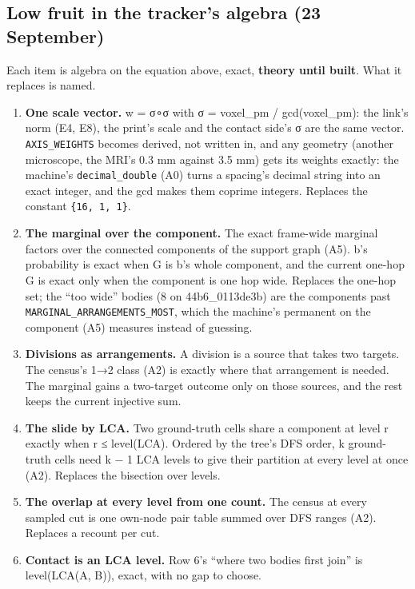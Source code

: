 \subsection{\texorpdfstring{Low fruit in the tracker's algebra (23 September)}{Low fruit in the tracker's algebra (23 September)}}

Each item is algebra on the equation above, exact, \textbf{theory until built}. What it replaces is named.

\begin{enumerate}
\item \textbf{One scale vector.} w = σ∘σ with σ = voxel\_\allowbreak{}pm / gcd(voxel\_\allowbreak{}pm): the link's norm (E4, E8), the print's scale and the contact side's σ are the same vector. \texttt{AXIS\_\allowbreak{}WEIGHTS} becomes derived, not written in, and any geometry (another microscope, the MRI's 0.3 mm against 3.5 mm) gets its weights exactly: the machine's \texttt{decimal\_\allowbreak{}double} (A0) turns a spacing's decimal string into an exact integer, and the gcd makes them coprime integers. Replaces the constant \texttt{\{16, 1, 1\}}.
\item \textbf{The marginal over the component.} The exact frame-wide marginal factors over the connected components of the support graph (A5). b's probability is exact when G is b's whole component, and the current one-hop G is exact only when the component is one hop wide. Replaces the one-hop set; the “too wide” bodies (8 on 44b6\_\allowbreak{}0113de3b) are the components past \texttt{MARGINAL\_\allowbreak{}ARRANGEMENTS\_\allowbreak{}MOST}, which the machine's permanent on the component (A5) measures instead of guessing.
\item \textbf{Divisions as arrangements.} A division is a source that takes two targets. The census's 1→2 class (A2) is exactly where that arrangement is needed. The marginal gains a two-target outcome only on those sources, and the rest keeps the current injective sum.
\item \textbf{The slide by LCA.} Two ground-truth cells share a component at level r exactly when r ≤ level(LCA). Ordered by the tree's DFS order, k ground-truth cells need k − 1 LCA levels to give their partition at every level at once (A2). Replaces the bisection over levels.
\item \textbf{The overlap at every level from one count.} The census at every sampled cut is one own-node pair table summed over DFS ranges (A2). Replaces a recount per cut.
\item \textbf{Contact is an LCA level.} Row 6's “where two bodies first join” is level(LCA(A, B)), exact, with no gap to choose.
\end{enumerate}

